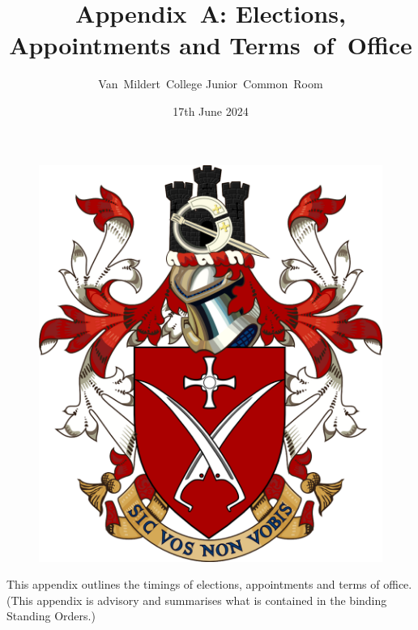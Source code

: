 \documentclass[12pt]{article}
\title{Appendix~A: Elections, Appointments and Terms~of~Office}
\author{Van~Mildert~College Junior~Common~Room}
\date{17th June 2024}
\begin{document}
    \begin{titlepage}  %
        \maketitle
        \begin{figure}[h]
            \includegraphics[scale=0.25]{arms}  %
            \centering
        \end{figure}
        \thispagestyle{empty}
    \end{titlepage}
    \setcounter{page}{2}  %

    This appendix outlines the timings of elections, appointments and terms of office.\\
    (This appendix is advisory and summarises what is contained in the binding Standing Orders.)
\end{document}
